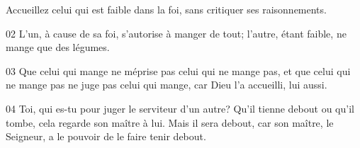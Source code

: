 Accueillez celui qui est faible dans la foi, sans critiquer ses raisonnements.

02 L’un, à cause de sa foi, s’autorise à manger de tout; l’autre, étant faible, ne mange que des légumes.

03 Que celui qui mange ne méprise pas celui qui ne mange pas, et que celui qui ne mange pas ne juge pas celui qui mange, car Dieu l’a accueilli, lui aussi.

04 Toi, qui es-tu pour juger le serviteur d’un autre? Qu’il tienne debout ou qu’il tombe, cela regarde son maître à lui. Mais il sera debout, car son maître, le Seigneur, a le pouvoir de le faire tenir debout.
